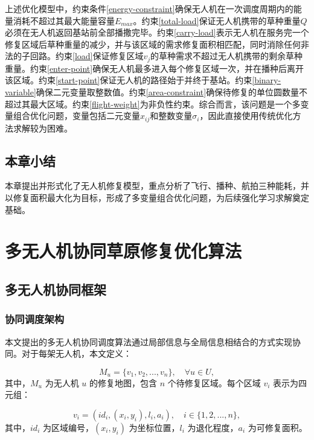 \documentclass[AutoFakeBold]{LZUThesis}
\begin{document}
上述优化模型中，约束条件\eqref{energy-constraint}确保无人机在一次调度周期内的能量消耗不超过其最大能量容量$E_{max}$。约束\eqref{total-load}保证无人机携带的草种重量$Q$必须在无人机返回基站前全部播撒完毕。约束\eqref{carry-load}表示无人机在服务完一个修复区域后草种重量的减少，并与该区域的需求修复面积相匹配，同时消除任何非法的子回路。约束\eqref{load}保证修复区域$v_j$的草种需求不超过无人机携带的剩余草种重量。约束\eqref{enter-point}确保无人机最多进入每个修复区域一次，并在播种后离开该区域。约束\eqref{start-point}保证无人机的路径始于并终于基站。约束\eqref{binary-variable}确保二元变量取整数值。约束\eqref{area-constraint}确保待修复的单位圆数量不超过其最大区域。约束\eqref{flight-weight}为非负性约束。综合而言，该问题是一个多变量组合优化问题，变量包括二元变量$x_{ij}$和整数变量$\sigma_i$，因此直接使用传统优化方法求解较为困难。


\section{本章小结}
本章提出并形式化了无人机修复模型，重点分析了飞行、播种、航拍三种能耗，并以修复面积最大化为目标，形成了多变量组合优化问题，为后续强化学习求解奠定基础。


\chapter{多无人机协同草原修复优化算法}

\section{多无人机协同框架}

\subsection{协同调度架构}

本文提出的多无人机协同调度算法通过局部信息与全局信息相结合的方式实现协同。对于每架无人机，本文定义：

\begin{equation}
	M_u = \{v_1, v_2, ..., v_n\}, \quad \forall u \in U,
\end{equation}
其中，$M_u$ 为无人机 $u$ 的修复地图，包含 $n$ 个待修复区域。每个区域 $v_i$ 表示为四元组：

\begin{equation}
	v_i = (id_i, (x_i, y_i), l_i, a_i), \quad i \in \{1,2,...,n\},
\end{equation}
其中，$id_i$ 为区域编号，$(x_i, y_i)$ 为坐标位置，$l_i$ 为退化程度，$a_i$ 为可修复面积。
\end{document}
